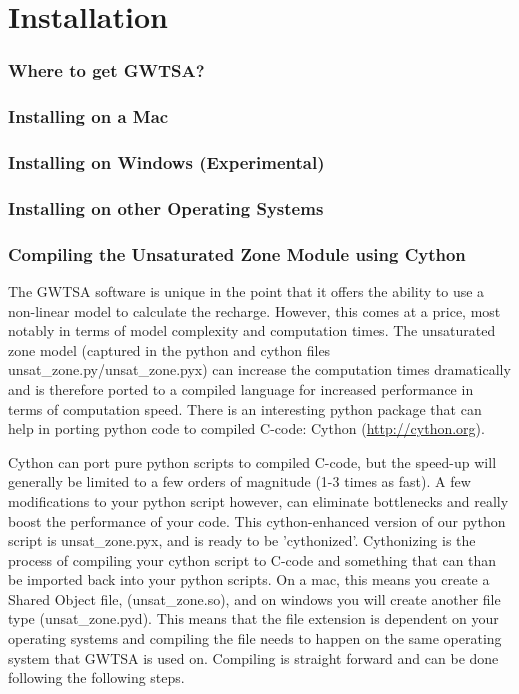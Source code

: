 \chapter{Installation}

\subsection{Where to get GWTSA?}


\subsection{Installing on a Mac}

\subsection{Installing on Windows (Experimental)}

\subsection{Installing on other Operating Systems}

\subsection{Compiling the Unsaturated Zone Module using Cython}
The GWTSA software is unique in the point that it offers the ability to use a non-linear model to calculate the recharge. However, this comes at a price, most notably in terms of model complexity and computation times. The unsaturated zone model (captured in the python and cython files unsat\_zone.py/unsat\_zone.pyx) can increase the computation times dramatically and is therefore ported to a compiled language for increased performance in terms of computation speed. There is an interesting python package that can help in porting python code to compiled C-code: Cython (\url{http://cython.org}).

Cython can port pure python scripts to compiled C-code, but the speed-up will generally be limited to a few orders of magnitude (1-3 times as fast). A few modifications to your python script however, can eliminate bottlenecks and really boost the performance of your code. This cython-enhanced version of our python script is unsat\_zone.pyx, and is ready to be 'cythonized'. Cythonizing is the process of compiling your cython script to C-code and something that can than be imported back into your python scripts. On a mac, this means you create a Shared Object file, (unsat\_zone.so), and on windows you will create another file type (unsat\_zone.pyd). This means that the file extension is dependent on your operating systems and compiling the file needs to happen on the same operating system that GWTSA is used on. Compiling is straight forward and can be done following the following steps.

